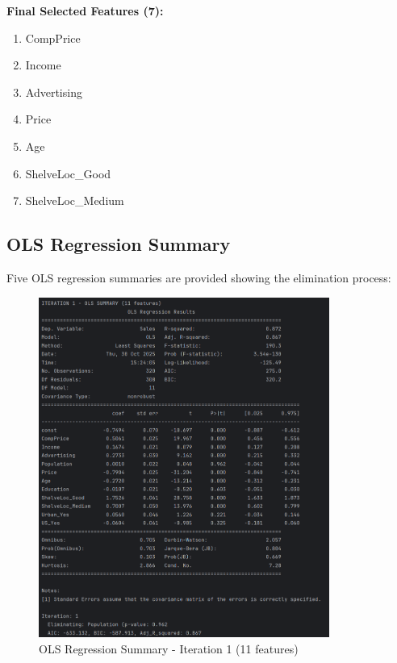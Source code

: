 \documentclass[12pt]{article}
\begin{document}
\textbf{Final Selected Features (7):}
\begin{enumerate}
    \item CompPrice
    \item Income
    \item Advertising
    \item Price
    \item Age
    \item ShelveLoc\_Good
    \item ShelveLoc\_Medium
\end{enumerate}

\subsection{OLS Regression Summary}

Five OLS regression summaries are provided showing the elimination process:

\begin{figure}[H]
    \centering
    \includegraphics[width=0.85\textwidth]{images/ols_summary_iter1.png}
    \caption{OLS Regression Summary - Iteration 1 (11 features)}
    \label{fig:ols_iter1}
\end{figure}
\end{document}
